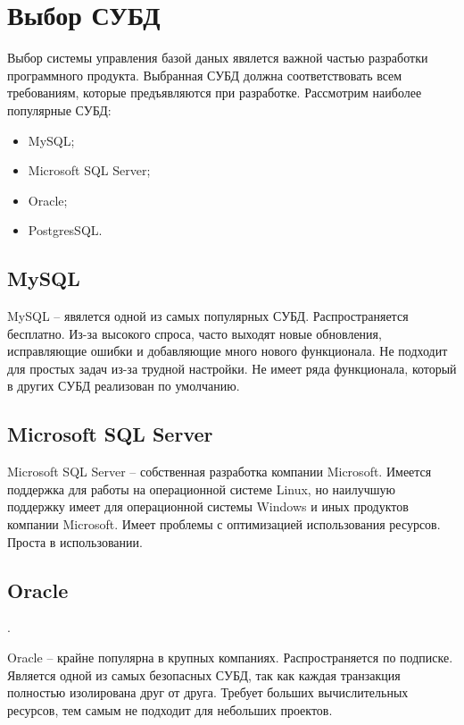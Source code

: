 \section{Выбор СУБД}

Выбор системы управления базой даных явялется важной частью разработки программного продукта. Выбранная СУБД должна соответствовать всем требованиям, которые предъявляются при разработке. Рассмотрим наиболее популярные СУБД:

\begin{itemize}
    \item MySQL;
    \item Microsoft SQL Server;
    \item Oracle;
    \item PostgresSQL.
\end{itemize}

\subsection{MySQL}

MySQL \cite{mysql} -- явялется одной из самых популярных СУБД. Распространяется бесплатно. Из-за высокого спроса, часто выходят новые обновления, исправляющие ошибки и добавляющие много нового функционала. Не подходит для простых задач из-за трудной настройки. Не имеет ряда функционала, который в других СУБД реализован по умолчанию.

\subsection{Microsoft SQL Server}

Microsoft SQL Server \cite{sqlserver} -- собственная разработка компании Microsoft. Имеется поддержка для работы на операционной системе Linux, но наилучшую поддержку имеет для операционной системы Windows и иных продуктов компании Microsoft. Имеет проблемы с оптимизацией использования ресурсов. Проста в использовании.

\subsection{Oracle}.

Oracle \cite{oracle} -- крайне популярна в крупных компаниях. Распространяется по подписке. Является одной из самых безопасных СУБД, так как каждая транзакция полностью изолирована друг от друга. Требует больших вычислительных ресурсов, тем самым не подходит для небольших проектов.

